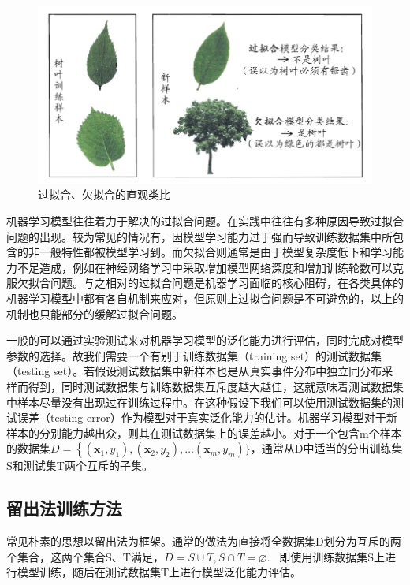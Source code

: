 \begin{figure}[ht]
  \centering
  \includegraphics[width=\linewidth]{img/fitting.jpg}
  \caption{过拟合、欠拟合的直观类比}\label{fig:yinglimoxin}
\end{figure}

 \indent 机器学习模型往往着力于解决的过拟合问题。在实践中往往有多种原因导致过拟合问题的出现。较为常见的情况有，因模型学习能力过于强而导致训练数据集中所包含的非一般特性都被模型学习到。而欠拟合则通常是由于模型复杂度低下和学习能力不足造成，例如在神经网络学习中采取增加模型网络深度和增加训练轮数可以克服欠拟合问题。与之相对的过拟合问题是机器学习面临的核心阻碍，在各类具体的机器学习模型中都有各自机制来应对，但原则上过拟合问题是不可避免的，以上的机制也只能部分的缓解过拟合问题。
 
 \indent 一般的可以通过实验测试来对机器学习模型的泛化能力进行评估，同时完成对模型参数的选择。故我们需要一个有别于训练数据集（training set）的测试数据集（testing set）。若假设测试数据集中新样本也是从真实事件分布中独立同分布采样而得到，同时测试数据集与训练数据集互斥度越大越佳，这就意味着测试数据集中样本尽量没有出现过在训练过程中。在这种假设下我们可以使用测试数据集的测试误差（testing error）作为模型对于真实泛化能力的估计。机器学习模型对于新样本的分别能力越出众，则其在测试数据集上的误差越小。对于一个包含m个样本的数据集$D=\left\{\left(\boldsymbol{x}_{1}, y_{1}\right),\left(\boldsymbol{x}_{2}, y_{2}\right), \ldots\right.\left(\boldsymbol{x}_{m}, y_{m}\right) \}$，通常从D中适当的分出训练集S和测试集T两个互斥的子集。
 
 \subsection{留出法训练方法}
 \indent 常见朴素的思想以留出法为框架。通常的做法为直接将全数据集D划分为互斥的两个集合，这两个集合S、T满足，$D=S \cup T, S \cap T=\varnothing$. ~即使用训练数据集S上进行模型训练，随后在测试数据集T上进行模型泛化能力评估。
 
